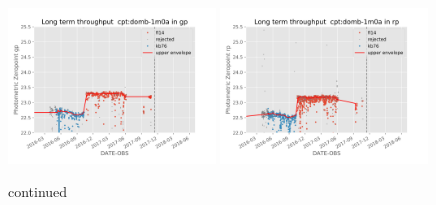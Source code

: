 \documentclass[]{spie}
\begin{document}
\begin{figure}
\includegraphics[width=0.49\textwidth]{images/photzptrend-cpt-domb-1m0a-gp.png} \hspace*{\fill} 
\includegraphics[width=0.49\textwidth]{images/photzptrend-cpt-domb-1m0a-rp.png} \\[1ex]
\caption {continued}
\end{figure}
\end{document}
